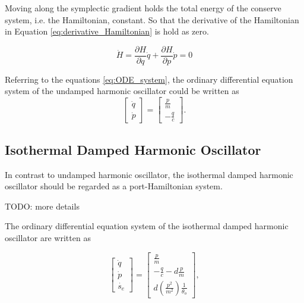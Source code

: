 \documentclass[
	parskip, 			   %
	twoside, 			   %
	DIV=14, 			   %
	BCOR=15.0mm, 		   %
	headsepline, 		   %
	open=right, 		   %
	captions=tableheading, %
	bibliography=totoc,    %
	numbers=noenddot       %
]{scrreprt}
\begin{document}
Moving along the symplectic gradient holds the total energy of the conserve system, i.e. the Hamiltonian, constant. So that the derivative of the Hamiltonian in Equation \ref{eq:derivative_Hamiltonian} is hold as zero.

\begin{equation}
    \label{eq:derivative_Hamiltonian}
    \dot{H}=\frac{\partial H}{\partial q}\dot{q}+\frac{\partial H}{\partial p}\dot{p}=0
\end{equation}

Referring to the equations \ref{eq:ODE_system}, the ordinary differential equation system of the undamped harmonic oscillator could be written as
\begin{equation}
    \label{eq:ODE_undamped_harmonic_oscillator}
    \begin{bmatrix}
    \dot{q}\\
    \dot{p}
    \end{bmatrix}
    =
    \begin{bmatrix}
    \frac{p}{m}\\
    -\frac{q}{c}
    \end{bmatrix}.
\end{equation}

\subsection{Isothermal Damped Harmonic Oscillator}
In contrast to undamped harmonic oscillator, the isothermal damped harmonic oscillator should be regarded as a port-Hamiltonian system.

TODO: more details

The ordinary differential equation system of the isothermal damped harmonic oscillator are written as

\begin{equation}
    \label{eq:ODE_isothermal_damped_harmonic_oscillator}
    \begin{bmatrix}
    \dot{q}\\
    \dot{p}\\
    \dot{s_{e}}
    \end{bmatrix}
    =
    \begin{bmatrix}
    \frac{p}{m}\\
    -\frac{q}{c}-d\frac{p}{m}\\
    d(\frac{p^2}{m^2})\frac{1}{\theta_{o}}
    \end{bmatrix},
\end{equation}
\end{document}
